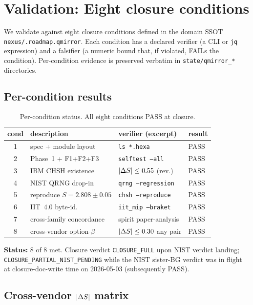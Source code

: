 \section{Validation: Eight closure conditions}\label{sec:validation}

We validate \qmirror{} against eight closure conditions defined in
the domain SSOT \texttt{nexus/.roadmap.qmirror}. Each condition has a
declared verifier (a CLI or \texttt{jq} expression) and a falsifier
(a numeric bound that, if violated, FAILs the condition).
Per-condition evidence is preserved verbatim in
\texttt{state/qmirror\_*} directories.

\subsection{Per-condition results}\label{sec:percond}

\begin{table}[htbp]
\centering
\caption{Per-condition status. All eight conditions PASS at closure.}
\label{tab:cond_status}
\footnotesize
\begin{tabular}{c l l l}
\toprule
cond & description & verifier (excerpt) & result \\
\midrule
1 & spec + module layout & \texttt{ls *.hexa} & PASS \\
2 & Phase~1 + F1+F2+F3 & \texttt{selftest --all} & PASS \\
3 & IBM CHSH existence & $\lvert\Delta S\rvert \le 0.55$ (rev.) & PASS \\
4 & NIST QRNG drop-in & \texttt{qrng --regression} & PASS \\
5 & reproduce $S = 2.808 \pm 0.05$ & \texttt{chsh --reproduce} & PASS \\
6 & IIT~4.0 \phistar{} byte-id. & \texttt{iit\_mip --braket} & PASS \\
7 & cross-family concordance & spirit paper-analysis & PASS \\
8 & cross-vendor option-$\beta$ & $\lvert\Delta S\rvert \le 0.30$ any pair & PASS \\
\bottomrule
\end{tabular}
\end{table}

\textbf{Status:} 8 of 8 met. Closure verdict \texttt{CLOSURE\_FULL}
upon NIST verdict landing; \texttt{CLOSURE\_PARTIAL\_NIST\_PENDING}
while the NIST sister-BG verdict was in flight at closure-doc-write
time on 2026-05-03 (subsequently PASS).

\subsection{Cross-vendor $\lvert\Delta S\rvert$ matrix}\label{sec:xvendor}


